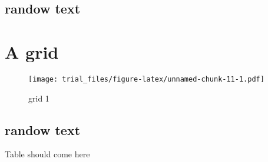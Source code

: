 \documentclass[]{article}
\begin{document}
\subsection{randow text}\label{randow-text-5}

\lipsum

\section{A grid}\label{a-grid-2}

\begin{figure}[htbp]
\centering
\texttt{[image: trial\_files/figure-latex/unnamed-chunk-11-1.pdf]}
\caption{grid 1}
\end{figure}

\subsection{randow text}\label{randow-text-6}

\lipsum

Table should come here
\end{document}
